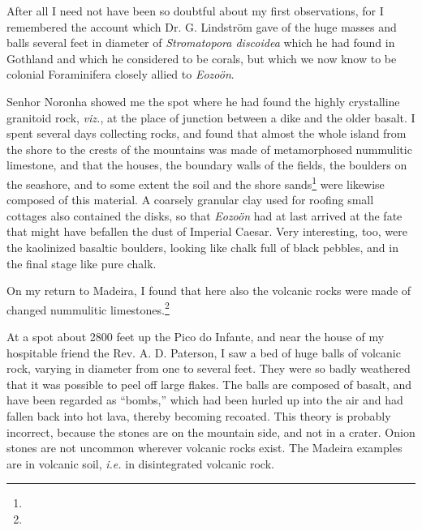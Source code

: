 \documentclass[a4paper, 12pt, oneside]{article}
\begin{document}
After all I need not have been so doubtful about my first observations, for I remembered the account which Dr. G. Lindström gave of the huge masses and balls several feet in diameter of \emph{Stromatopora discoidea} which he had found in Gothland and which he considered to be corals, but which we now know to be colonial Foraminifera closely allied to \emph{Eozoön}.

Senhor Noronha showed me the spot where he had found the highly crystalline granitoid rock, \emph{viz.}, at the place of junction between a dike and the older basalt. I spent several days collecting rocks, and found that almost the whole island from the shore to the crests of the mountains was made of metamorphosed nummulitic limestone, and that the houses, the boundary walls of the fields, the boulders on the seashore, and to some extent the soil and the shore sands\footnote{} were likewise composed of this material. A coarsely granular clay used for roofing small cottages also contained the disks, so that \emph{Eozoön} had at last arrived at the fate that might have befallen the dust of Imperial Caesar. Very interesting, too, were the kaolinized basaltic boulders, looking like chalk full of black pebbles, and in the final stage like pure chalk.

On my return to Madeira, I found that here also the volcanic rocks were made of changed nummulitic limestones.\footnote{}

At a spot about 2800 feet up the Pico do Infante, and near the house of my hospitable friend the Rev. A. D. Paterson, I saw a bed of huge balls of volcanic rock, varying in diameter from one to several feet. They were so badly weathered that it was possible to peel off large flakes. The balls are composed of basalt, and have been regarded as ``bombs,'' which had been hurled up into the air and had fallen back into hot lava, thereby becoming recoated. This theory is probably incorrect, because the stones are on the mountain side, and not in a crater. Onion stones are not uncommon wherever volcanic rocks exist. The Madeira examples are in volcanic soil, \emph{i.e.} in disintegrated volcanic rock.
\end{document}
